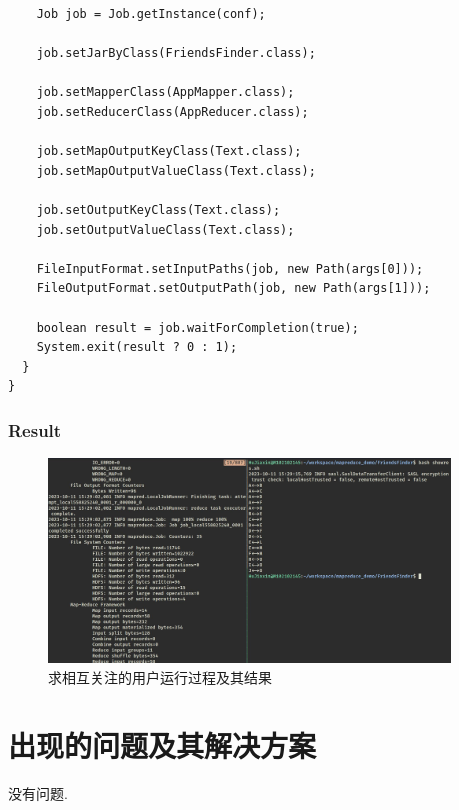 \documentclass{article}
\begin{document}
\begin{center}
\begin{verbatim}
    Job job = Job.getInstance(conf);

    job.setJarByClass(FriendsFinder.class);

    job.setMapperClass(AppMapper.class);
    job.setReducerClass(AppReducer.class);

    job.setMapOutputKeyClass(Text.class);
    job.setMapOutputValueClass(Text.class);

    job.setOutputKeyClass(Text.class);
    job.setOutputValueClass(Text.class);

    FileInputFormat.setInputPaths(job, new Path(args[0]));
    FileOutputFormat.setOutputPath(job, new Path(args[1]));

    boolean result = job.waitForCompletion(true);
    System.exit(result ? 0 : 1);
  }
}
\end{verbatim}
    \end{center}

    \subsubsection{Result}

    \begin{figure}[H]
      \begin{center}
        \includegraphics[width=0.95\textwidth]{./figures/3.jpg}
      \end{center}
      \caption{求相互关注的用户运行过程及其结果}
    \end{figure}

    \section{出现的问题及其解决方案}
    没有问题.
\end{document}

